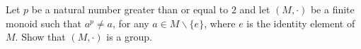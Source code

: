 Let $p$ be a natural number greater than or equal to $2$ and let $(M, \cdot)$ be a finite monoid such that $a^p \ne a$, for any $a\in M \backslash \{e\}$, where $e$ is the identity element of $M$. Show that $(M, \cdot)$ is a group.